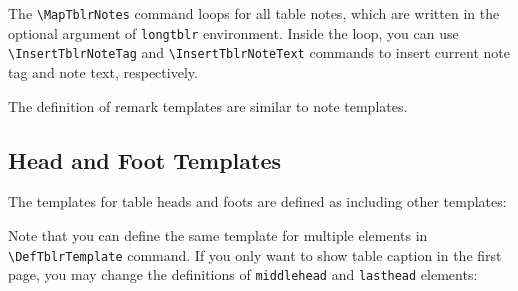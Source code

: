 \documentclass[oneside]{book}
\begin{document}
\begin{codehigh}
\end{codehigh}
\begin{codehigh}
\end{codehigh}

The \verb!\MapTblrNotes! command loops for all table notes,
which are written in the optional argument of \verb!longtblr! environment.
Inside the loop, you can use \verb!\InsertTblrNoteTag! and \verb!\InsertTblrNoteText!
commands to insert current note tag and note text, respectively.

The definition of remark templates are similar to note templates.
\nopagebreak
\begin{codehigh}
\end{codehigh}
\begin{codehigh}
\end{codehigh}

\subsection{Head and Foot Templates}

The templates for table heads and foots are defined as including other templates:

\begin{codehigh}
\end{codehigh}

Note that you can define the same template for multiple elements in \verb!\DefTblrTemplate! command.
If you only want to show table caption in the first page, you may change the definitions of
\verb!middlehead! and \verb!lasthead! elements:
\end{document}

